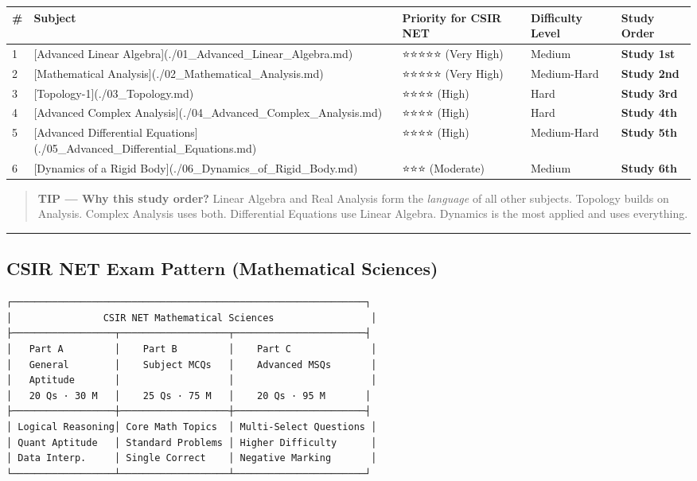 \documentclass[12pt,a4paper,openany]{book}
\begin{document}
\begin{center}
\begin{tabular}{|l|l|l|l|l|}
\hline
\textbf{#} & \textbf{Subject} & \textbf{Priority for CSIR NET} & \textbf{Difficulty Level} & \textbf{Study Order} \\
\hline
1 & [Advanced Linear Algebra](./01_Advanced_Linear_Algebra.md) & ⭐⭐⭐⭐⭐ (Very High) &  Medium & \textbf{Study 1st} \\
\hline
2 & [Mathematical Analysis](./02_Mathematical_Analysis.md) & ⭐⭐⭐⭐⭐ (Very High) &  Medium-Hard & \textbf{Study 2nd} \\
\hline
3 & [Topology-1](./03_Topology.md) & ⭐⭐⭐⭐ (High) &  Hard & \textbf{Study 3rd} \\
\hline
4 & [Advanced Complex Analysis](./04_Advanced_Complex_Analysis.md) & ⭐⭐⭐⭐ (High) &  Hard & \textbf{Study 4th} \\
\hline
5 & [Advanced Differential Equations](./05_Advanced_Differential_Equations.md) & ⭐⭐⭐⭐ (High) &  Medium-Hard & \textbf{Study 5th} \\
\hline
6 & [Dynamics of a Rigid Body](./06_Dynamics_of_Rigid_Body.md) & ⭐⭐⭐ (Moderate) &  Medium & \textbf{Study 6th} \\
\hline
\end{tabular}
\end{center}

\begin{quote}
\textbf{ TIP — Why this study order?}
Linear Algebra and Real Analysis form the \textit{language} of all other subjects. Topology builds on Analysis. Complex Analysis uses both. Differential Equations use Linear Algebra. Dynamics is the most applied and uses everything.
\end{quote}

\bigskip\noindent\rule{\textwidth}{0.4pt}\bigskip

\subsection{ CSIR NET Exam Pattern (Mathematical Sciences)}

\begin{verbatim}
┌──────────────────────────────────────────────────────────────┐
│                CSIR NET Mathematical Sciences                 │
├──────────────────┬───────────────────┬───────────────────────┤
│   Part A         │    Part B         │    Part C              │
│   General        │    Subject MCQs   │    Advanced MSQs       │
│   Aptitude       │                   │                        │
│   20 Qs · 30 M   │    25 Qs · 75 M   │    20 Qs · 95 M       │
├──────────────────┼───────────────────┼───────────────────────┤
│ Logical Reasoning│ Core Math Topics  │ Multi-Select Questions │
│ Quant Aptitude   │ Standard Problems │ Higher Difficulty      │
│ Data Interp.     │ Single Correct    │ Negative Marking       │
└──────────────────┴───────────────────┴───────────────────────┘
\end{verbatim}
\end{document}
